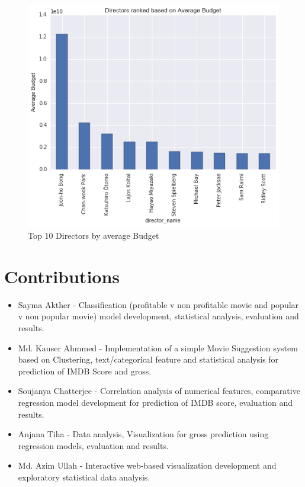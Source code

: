 \documentclass{article}%
\begin{document}
\begin{figure}
\centering
\includegraphics[width=1.0\columnwidth]{Fig/DirectorsRankedonAverageBudget.png}
\caption{Top 10 Directors by average Budget}
\label{fig:DirectorsRankedonAverageBudget}
\end{figure}

\section{Contributions}

\begin{itemize}
\item Sayma Akther - Classification (profitable v non profitable movie and popular v non popular movie) model development, statistical analysis, evaluation and results.
\item Md. Kauser Ahmmed - Implementation of a simple Movie Suggestion system based on Clustering, text/categorical feature and statistical analysis for prediction of IMDB Score and gross.
\item Soujanya Chatterjee - Correlation analysis of numerical features, comparative regression model development for prediction of IMDB score, evaluation and results.
\item Anjana Tiha - Data analysis, Visualization for gross prediction using regression models, evaluation and results.
\item Md. Azim Ullah - Interactive web-based visualization development and exploratory statistical data analysis.
\end{itemize}
\end{document}
